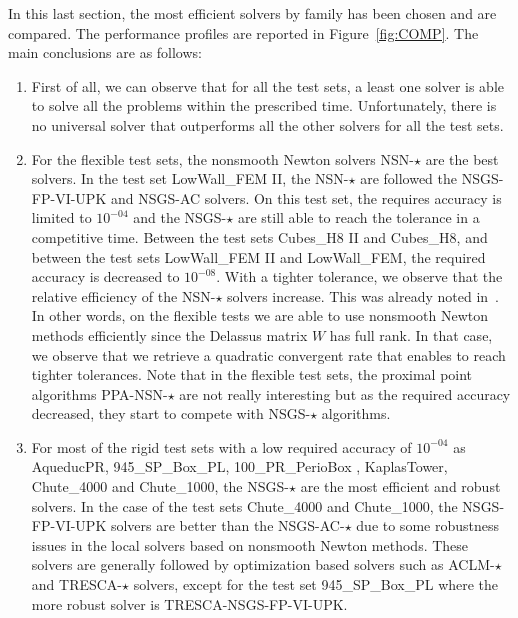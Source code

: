 In this last section, the most efficient solvers by family has been chosen and are compared. The performance profiles are reported in Figure~\ref{fig:COMP}. The main conclusions are as follows:
\begin{enumerate}
\item First of all, we can observe that for all the test sets, a least one solver is able to solve all the problems within the prescribed time.  Unfortunately, there is no universal solver that outperforms all the other solvers for all the test sets.
\item For the flexible test sets, the nonsmooth Newton solvers {\sf NSN-$\star$} are the best solvers. In the test set LowWall\_FEM II, the {\sf NSN-$\star$} are followed the {\sf NSGS-FP-VI-UPK} and {\sf NSGS-AC} solvers. On this test set, the requires accuracy is limited to $10^{-04}$ and the  {\sf NSGS-$\star$} are still able to reach the tolerance in a competitive time. Between the test sets {Cubes\_H8 II} and {Cubes\_H8}, and between the test sets  LowWall\_FEM II and LowWall\_FEM, the required accuracy is decreased to $10^{-08}$. With a tighter tolerance, we observe that the relative efficiency of the {\sf NSN-$\star$} solvers increase. This was already noted in~\citep{Acary.ea_CSMA2017}. In other words, on the flexible tests we are able to use nonsmooth Newton methods efficiently since the Delassus matrix $W$ has full rank. In that case, we observe that we retrieve a quadratic convergent rate that enables to reach tighter tolerances. Note that in the flexible test sets, the proximal point algorithms {\sf PPA-NSN-$\star$} are not really interesting but as the required accuracy decreased, they start to compete with {\sf NSGS-$\star$} algorithms.

\item For most of the rigid test sets with a low required accuracy of $10^{-04}$ as AqueducPR, 945\_SP\_Box\_PL, 100\_PR\_PerioBox , KaplasTower, Chute\_4000 and Chute\_1000,   the {\sf NSGS-$\star$} are the most efficient and robust solvers. In the case of the test sets Chute\_4000 and Chute\_1000,  the {\sf NSGS-FP-VI-UPK} solvers are better than the {\sf NSGS-AC-$\star$} due to some robustness issues in the local solvers based on nonsmooth Newton methods. These solvers are generally followed by optimization based solvers such as {\sf ACLM-$\star$} and {\sf TRESCA-$\star$} solvers, except for the test set 945\_SP\_Box\_PL where the more robust solver is {\sf TRESCA-NSGS-FP-VI-UPK}.
  

\end{enumerate}
